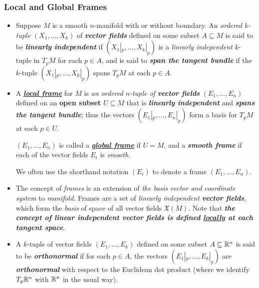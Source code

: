 \documentclass[11pt]{article}
\begin{document}
\subsubsection{Local and Global Frames}
\begin{itemize}
\item \begin{definition}
Suppose $M$ is a smooth $n$-manifold with or without boundary. An \emph{ordered $k$-tuple} $(X_1, \ldots, X_k)$ of \emph{\textbf{vector fields}} defined on some subset $A \subseteq M$ is said to be \textit{\textbf{linearly independent}} if $(X_1|_{p}, \ldots, X_k|_{p})$ is a \emph{linearly independent} $k$-tuple in $T_{p}M$ for each $p \in A$, and is said to \emph{\textbf{span the tangent bundle}} if the $k$-tuple $(X_1|_{p},\ldots,X_k|_{p})$ spans $T_{p}M$ at each $p \in A$. 
\end{definition}

\item \begin{definition}
A \underline{\emph{\textbf{local frame}}} for $M$ is \emph{an ordered $n$-tuple of \textbf{vector fields}} $(E_1,\ldots,E_n)$ defined on an \textbf{open subset} $U \subseteq M$ that is \emph{\textbf{linearly independent}} and \emph{\textbf{spans the tangent bundle}}; thus the vectors $(E_1|_{p},\ldots,E_n|_{p})$ form a basis for $T_{p}M$ at each $p \in U$.

$(E_1,\ldots,E_n)$ is called a \underline{\emph{\textbf{global frame}}} if $U = M$, and a \emph{\textbf{smooth frame}} if each of the vector fields $E_i$ is \emph{smooth}.
\end{definition} We often use the shorthand notation $(E_i)$ to denote a frame $(E_1,\ldots,E_n)$. 

\item \begin{remark}
The concept of \emph{frames} is an extension of \emph{the basis vector and coordinate system} to \emph{manifold}. Frames are a set of \emph{linearly independent \textbf{vector fields}}, which form the \emph{basis} of space of all vector fields $\mathfrak{X}(M)$. Note that \emph{\textbf{the concept of linear independent vector fields is defined \underline{locally} at each tangent space}}. 
\end{remark}

\item \begin{definition}
A $k$-tuple of vector fields $(E_1,\ldots,E_k)$ defined on some subset $A \subseteq {\mathbb R}^n$ is said to be \emph{\textbf{orthonormal}} if for each $p \in A$, the vectors $(E_1|_{p},\ldots,E_k|_{p})$ are \emph{\textbf{orthonormal}} with respect to the Euclidean dot product (where we identify $T_{p}{\mathbb R}^n$ with ${\mathbb R}^n$ in the usual way). 


\end{definition}
\end{itemize}
\end{document}
